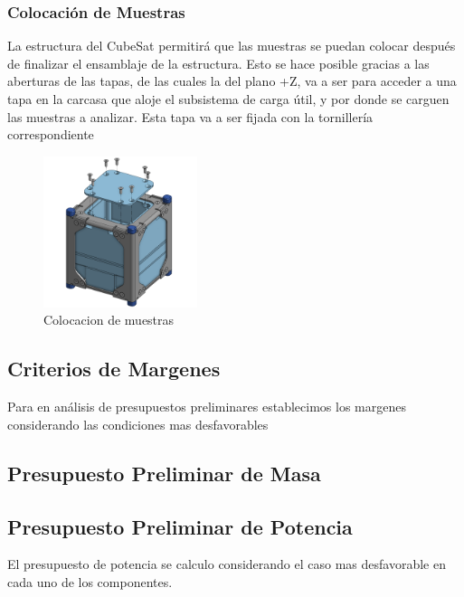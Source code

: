     \subsubsection{Colocación de Muestras}

      La estructura del CubeSat permitirá que las muestras se puedan colocar después de
      finalizar el ensamblaje de la estructura. Esto se hace posible gracias a las aberturas de las
      tapas, de las cuales la del plano +Z, va a ser para acceder a una tapa en la carcasa que aloje
      el subsistema de carga útil, y por donde se carguen las muestras a analizar. Esta tapa va a
      ser fijada con la tornillería correspondiente

      \begin{figure}[H]
        \centering
        \includegraphics[width=0.4\textwidth]{image/structure/muestras.png}
        \caption{Colocacion de muestras}
        \label{fig:structure-muestra}
      \end{figure}

  \subsection{Criterios de Margenes}
    Para en análisis de presupuestos preliminares establecimos los margenes considerando las
    condiciones mas desfavorables

  \subsection{Presupuesto Preliminar de Masa}

  \subsection{Presupuesto Preliminar de Potencia}
    El presupuesto de potencia se calculo considerando el caso mas desfavorable en cada uno
    de los componentes.

